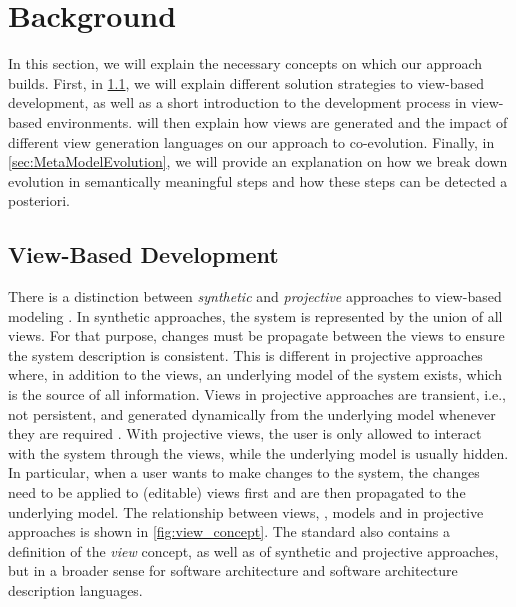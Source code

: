 \section{Background}
\label{sec:Background}

In this section, we will explain the necessary concepts on which our approach builds. First, in \cref{sec:ViewBasedDevelopment}, we will explain different solution strategies to view-based development, as well as a short introduction to the development process in view-based environments.  will then explain how views are generated and the impact of different view generation languages on our approach to \metamodel \viewtype co-evolution. Finally, in \cref{sec:MetaModelEvolution}, we will provide an explanation on how we break down \metamodel evolution in semantically meaningful steps and how these steps can be detected a posteriori.


\subsection{View-Based Development}
\label{sec:ViewBasedDevelopment}

There is a distinction between \emph{synthetic} and \emph{projective} approaches to view-based modeling \autocite{atkinson_fundamental_2015}.
In synthetic approaches, the system is represented by the union of all views.
For that purpose, changes must be propagate between the views to ensure the system description is consistent.
This is different in projective approaches where, in addition to the views, an underlying model of the system exists, which is the source of all information.
Views in projective approaches are transient, i.e., not persistent, and generated dynamically from the underlying model whenever they are required \autocite{atkinson_orthographic_2010}.
With projective views, the user is only allowed to interact with the system through the views, while the underlying model is usually hidden.
In particular, when a user wants to make changes to the system, the changes need to be applied to (editable) views first and are then propagated to the underlying model.
The relationship between views, \viewtypes, models and \metamodels in projective approaches is shown in \cref{fig:view_concept}.
The \cite{ISO42010} standard also contains a definition of the \emph{view} concept, as well as of synthetic and projective approaches, but in a broader sense for software architecture and software architecture description languages.

